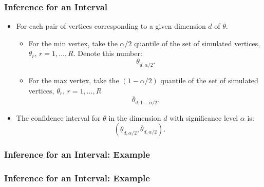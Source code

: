 \begin{frame}
\frametitle{Inference for an Interval}

\begin{itemize}
	\item For each pair of vertices corresponding to a given dimension $d$ of $\theta$.
	\begin{itemize}
		\item For the min vertex, take the $\alpha/2$ quantile of the set of simulated vertices, $\theta_{r}$, $r=1,\dots,R$. Denote this number:
		\begin{equation*}
		\underline{\theta}_{d,\alpha/2}.
		\end{equation*}
		\item For the max vertex, take the $(1-\alpha/2)$ quantile of the set of simulated vertices, $\theta_{r}$, $r=1,\dots,R$
		\begin{equation*}
		\overline{\theta}_{d,1-\alpha/2}.
		\end{equation*}
	\end{itemize}
	\item The confidence interval for $\theta$ in the dimension $d$ with significance level $\alpha$ is:
	\begin{equation*}
	(\underline{\theta}_{d,\alpha/2},\overline{\theta}_{d,\alpha/2}).
	\end{equation*}
\end{itemize}
\end{frame}
\begin{frame}
\frametitle{Inference for an Interval: Example}

\begin{figure}[h!]
\begin{center}
\end{center}
\end{figure}	
\end{frame}
\begin{frame}
\frametitle{Inference for an Interval: Example}

\begin{figure}[h!]
\begin{center}
\end{center}
\end{figure}	
\end{frame}

